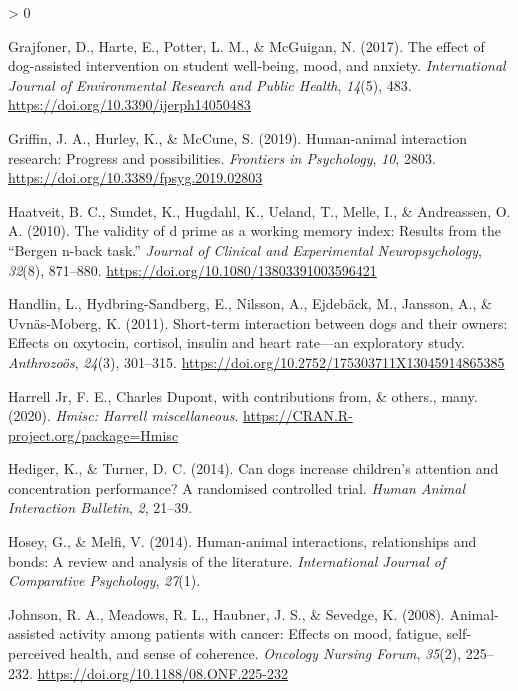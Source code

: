 \documentclass[
  english,
  pub,floatsintext]{apa6}
\newlength{\cslhangindent}
\newenvironment{CSLReferences}[2] %
 {%
  \setlength{\parindent}{0pt}
  \ifodd #1 \everypar{\setlength{\hangindent}{\cslhangindent}}\ignorespaces\fi
  \ifnum #2 > 0
  \setlength{\parskip}{#2\baselineskip}
  \fi
 }%
 {}
\begin{document}
\begin{CSLReferences}{1}{0}
\leavevmode\hypertarget{ref-Grajfoner.etal.2017}{}%
Grajfoner, D., Harte, E., Potter, L. M., \& McGuigan, N. (2017). The effect of dog-assisted intervention on student well-being, mood, and anxiety. \emph{International Journal of Environmental Research and Public Health}, \emph{14}(5), 483. \url{https://doi.org/10.3390/ijerph14050483}

\leavevmode\hypertarget{ref-Griffin.etal.2019}{}%
Griffin, J. A., Hurley, K., \& McCune, S. (2019). Human-animal interaction research: {Progress} and possibilities. \emph{Frontiers in Psychology}, \emph{10}, 2803. \url{https://doi.org/10.3389/fpsyg.2019.02803}

\leavevmode\hypertarget{ref-Haatveit.etal.2010}{}%
Haatveit, B. C., Sundet, K., Hugdahl, K., Ueland, T., Melle, I., \& Andreassen, O. A. (2010). The validity of d prime as a working memory index: {Results} from the {``{Bergen} n-back task.''} \emph{Journal of Clinical and Experimental Neuropsychology}, \emph{32}(8), 871--880. \url{https://doi.org/10.1080/13803391003596421}

\leavevmode\hypertarget{ref-Handlin.etal.2011}{}%
Handlin, L., Hydbring-Sandberg, E., Nilsson, A., Ejdebäck, M., Jansson, A., \& Uvnäs-Moberg, K. (2011). Short-term interaction between dogs and their owners: Effects on oxytocin, cortisol, insulin and heart rate---an exploratory study. \emph{Anthrozoös}, \emph{24}(3), 301--315. \url{https://doi.org/10.2752/175303711X13045914865385}

\leavevmode\hypertarget{ref-R-Hmisc}{}%
Harrell Jr, F. E., Charles Dupont, with contributions from, \& others., many. (2020). \emph{Hmisc: Harrell miscellaneous}. \url{https://CRAN.R-project.org/package=Hmisc}

\leavevmode\hypertarget{ref-Hediger.Turner.2014}{}%
Hediger, K., \& Turner, D. C. (2014). Can dogs increase children's attention and concentration performance? {A} randomised controlled trial. \emph{Human Animal Interaction Bulletin}, \emph{2}, 21--39.

\leavevmode\hypertarget{ref-Hosey.Melfi.2014}{}%
Hosey, G., \& Melfi, V. (2014). Human-animal interactions, relationships and bonds: A review and analysis of the literature. \emph{International Journal of Comparative Psychology}, \emph{27}(1).

\leavevmode\hypertarget{ref-Johnson.etal.2008a}{}%
Johnson, R. A., Meadows, R. L., Haubner, J. S., \& Sevedge, K. (2008). Animal-assisted activity among patients with cancer: Effects on mood, fatigue, self-perceived health, and sense of coherence. \emph{Oncology Nursing Forum}, \emph{35}(2), 225--232. \url{https://doi.org/10.1188/08.ONF.225-232}


\end{CSLReferences}
\end{document}
